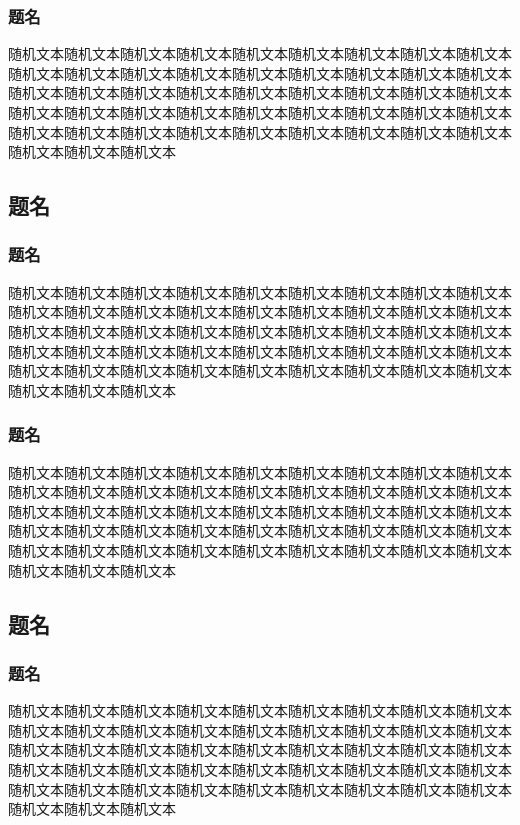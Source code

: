 \documentclass{paper}
\begin{document}
\subsubsection{题名}
随机文本随机文本随机文本随机文本随机文本随机文本随机文本随机文本随机文本随机文本随机文本随机文本随机文本随机文本随机文本随机文本随机文本随机文本随机文本随机文本随机文本随机文本随机文本随机文本随机文本随机文本随机文本随机文本随机文本随机文本随机文本随机文本随机文本随机文本随机文本随机文本随机文本随机文本随机文本随机文本随机文本随机文本随机文本随机文本随机文本随机文本随机文本随机文本
\subsection{题名}
\subsubsection{题名}
随机文本随机文本随机文本随机文本随机文本随机文本随机文本随机文本随机文本随机文本随机文本随机文本随机文本随机文本随机文本随机文本随机文本随机文本随机文本随机文本随机文本随机文本随机文本随机文本随机文本随机文本随机文本随机文本随机文本随机文本随机文本随机文本随机文本随机文本随机文本随机文本随机文本随机文本随机文本随机文本随机文本随机文本随机文本随机文本随机文本随机文本随机文本随机文本
\subsubsection{题名}
随机文本随机文本随机文本随机文本随机文本随机文本随机文本随机文本随机文本随机文本随机文本随机文本随机文本随机文本随机文本随机文本随机文本随机文本随机文本随机文本随机文本随机文本随机文本随机文本随机文本随机文本随机文本随机文本随机文本随机文本随机文本随机文本随机文本随机文本随机文本随机文本随机文本随机文本随机文本随机文本随机文本随机文本随机文本随机文本随机文本随机文本随机文本随机文本
\subsection{题名}
\subsubsection{题名}
随机文本随机文本随机文本随机文本随机文本随机文本随机文本随机文本随机文本随机文本随机文本随机文本随机文本随机文本随机文本随机文本随机文本随机文本随机文本随机文本随机文本随机文本随机文本随机文本随机文本随机文本随机文本随机文本随机文本随机文本随机文本随机文本随机文本随机文本随机文本随机文本随机文本随机文本随机文本随机文本随机文本随机文本随机文本随机文本随机文本随机文本随机文本随机文本
\end{document}
